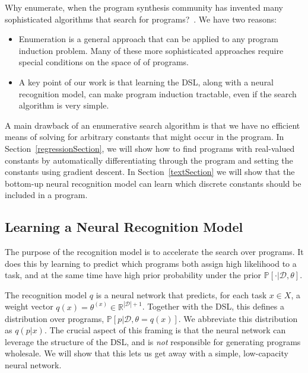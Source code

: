\documentclass{article}
\newcommand{\probability}{\mathds{P}} %
\begin{document}
Why enumerate, when the program synthesis community has invented many
sophisticated algorithms that search for programs?~\cite{solar2008program,schkufza2013stochastic,feser2015synthesizing,osera2015type,polozov2015flashmeta}.
We have two reasons:%
\begin{itemize}
\item Enumeration is a general approach that can be applied to any program induction problem. Many of these more sophisticated approaches require special conditions on
  the space of of programs.
\item A key point of our work is that learning the DSL, along with a neural recognition model, can make program induction tractable, even if the
  search algorithm is very simple.  
\end{itemize}
A main drawback of an enumerative search algorithm is that we have no
efficient means of solving for arbitrary constants that might occur in the
program. In Section~\ref{regressionSection},
we will show how to find programs with real-valued constants
by automatically differentiating through the program and setting the constants using gradient descent.
In Section~\ref{textSection}
we will show that the bottom-up neural recognition model can learn
which discrete constants should be included in a program.







\subsection{Learning a Neural Recognition Model}\label{recognitionSection}

The purpose of the recognition model is to accelerate the search over
programs.  It does this by learning to predict which programs both 
assign high likelihood to a task, and at the same time 
have high prior probability under the prior $\probability[\cdot |\mathcal{D},\theta]$.

The recognition model $q$ is a neural network that predicts,
for each task $x\in X$, a weight vector $q(x) = \theta^{(x)}\in \mathbb{R}^{|\mathcal{D}| + 1}$.
Together with the DSL, this defines a distribution over programs,
$\probability[p|\mathcal{D},\theta = q(x)]$.
We abbreviate this distribution as $q(p|x)$.
The crucial aspect of this framing is that the neural network
can leverage the structure of the DSL,
and is \emph{not} responsible for
generating programs wholesale.
We will show that this lets us get away with a simple, low-capacity neural network.
\end{document}

